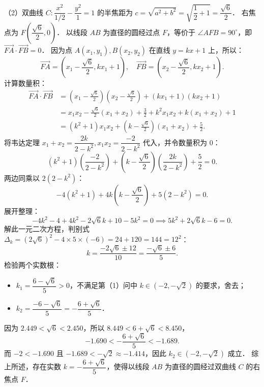 \begin{answer}
（2）双曲线 $C: \dfrac{x^2}{1/2} - \dfrac{y^2}{1} = 1$ 的半焦距为 $c = \sqrt{a^2 + b^2} = \sqrt{\dfrac{1}{2} + 1} = \dfrac{\sqrt{6}}{2}$．
右焦点为 $F\left(\dfrac{\sqrt{6}}{2}, 0\right)$．
以线段 $AB$ 为直径的圆经过点 $F$，等价于 $\angle AFB = 90^\circ$，即 $\overrightarrow{FA} \cdot \overrightarrow{FB} = 0$．
因为点 $A(x_1, y_1), B(x_2, y_2)$ 在直线 $y = kx + 1$ 上，所以：
\nopagebreak[4]
\[
\overrightarrow{FA} = \left(x_1 - \frac{\sqrt{6}}{2}, kx_1 + 1\right), \quad \overrightarrow{FB} = \left(x_2 - \frac{\sqrt{6}}{2}, kx_2 + 1\right).
\]
计算数量积：
\nopagebreak[4]
\[
\begin{aligned}
\overrightarrow{FA} \cdot \overrightarrow{FB} &= \left(x_1 - \frac{\sqrt{6}}{2}\right)\left(x_2 - \frac{\sqrt{6}}{2}\right) + (kx_1 + 1)(kx_2 + 1) \\
&= x_1 x_2 - \frac{\sqrt{6}}{2}(x_1 + x_2) + \frac{3}{2} + k^2 x_1 x_2 + k(x_1 + x_2) + 1 \\
&= (k^2 + 1)x_1 x_2 + \left(k - \frac{\sqrt{6}}{2}\right)(x_1 + x_2) + \frac{5}{2}.
\end{aligned}
\]
将韦达定理 $x_1 + x_2 = \dfrac{2k}{2 - k^2}, x_1 x_2 = \dfrac{-2}{2 - k^2}$ 代入，并令数量积为 $0$：
\nopagebreak[4]
\[
(k^2 + 1)\left(\frac{-2}{2 - k^2}\right) + \left(k - \frac{\sqrt{6}}{2}\right)\left(\frac{2k}{2 - k^2}\right) + \frac{5}{2} = 0.
\]
两边同乘以 $2(2 - k^2)$：
\nopagebreak[4]
\[
-4(k^2 + 1) + 4k\left(k - \frac{\sqrt{6}}{2}\right) + 5(2 - k^2) = 0.
\]
展开整理：
\nopagebreak[4]
\[
-4k^2 - 4 + 4k^2 - 2\sqrt{6}k + 10 - 5k^2 = 0 \implies 5k^2 + 2\sqrt{6}k - 6 = 0.
\]
解此一元二次方程，判别式 $\Delta_k = (2\sqrt{6})^2 - 4 \times 5 \times (-6) = 24 + 120 = 144 = 12^2$：
\nopagebreak[4]
\[
k = \frac{-2\sqrt{6} \pm 12}{10} = \frac{-\sqrt{6} \pm 6}{5}.
\]
检验两个实数根：
\begin{itemize}
\item $k_1 = \dfrac{6 - \sqrt{6}}{5} > 0$，不满足第（1）问中 $k \in (-2, -\sqrt{2})$ 的要求，舍去；
\item $k_2 = \dfrac{-6 - \sqrt{6}}{5} = -\dfrac{6 + \sqrt{6}}{5}$．
\end{itemize}
因为 $2.449 < \sqrt{6} < 2.450$，所以 $8.449 < 6 + \sqrt{6} < 8.450$，
\nopagebreak[4]
\[
-1.690 < -\frac{6 + \sqrt{6}}{5} < -1.689.
\]
而 $-2 < -1.690$ 且 $-1.689 < -\sqrt{2} \approx -1.414$，因此 $k_2 \in (-2, -\sqrt{2})$ 成立．
综上所述，存在实数 $k = -\dfrac{6 + \sqrt{6}}{5}$，使得以线段 $AB$ 为直径的圆经过双曲线 $C$ 的右焦点 $F$．


\end{answer}
